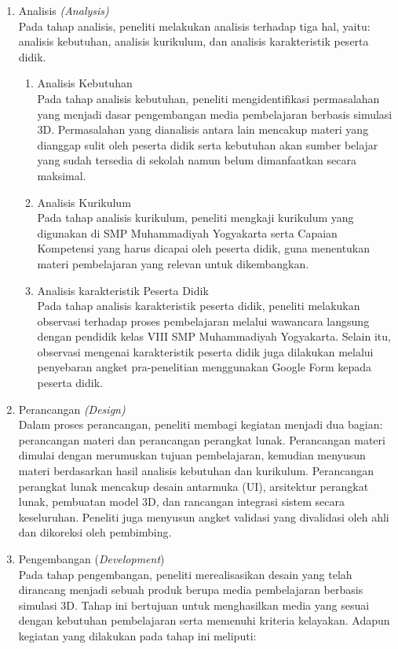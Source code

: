 \begin{enumerate}
    \item Analisis \textit{(Analysis)}\\
    \hspace*{1cm}Pada tahap analisis, peneliti melakukan analisis terhadap tiga hal, yaitu: analisis kebutuhan, analisis kurikulum, dan analisis karakteristik peserta didik.
    \begin{enumerate}
        \item Analisis Kebutuhan\\
        \hspace*{1cm}Pada tahap analisis kebutuhan, peneliti mengidentifikasi permasalahan yang menjadi dasar pengembangan media pembelajaran berbasis simulasi 3D. Permasalahan yang dianalisis antara lain mencakup materi yang dianggap sulit oleh peserta didik serta kebutuhan akan sumber belajar yang sudah tersedia di sekolah namun belum dimanfaatkan secara maksimal.
        \item Analisis Kurikulum\\
        \hspace*{1cm}Pada tahap analisis kurikulum, peneliti mengkaji kurikulum yang digunakan di SMP Muhammadiyah Yogyakarta serta Capaian Kompetensi yang harus dicapai oleh peserta didik, guna menentukan materi pembelajaran yang relevan untuk dikembangkan.
        \item Analisis karakteristik Peserta Didik\\
        \hspace*{1cm}Pada tahap analisis karakteristik peserta didik, peneliti melakukan observasi terhadap proses pembelajaran melalui wawancara langsung dengan pendidik kelas VIII SMP Muhammadiyah Yogyakarta. Selain itu, observasi mengenai karakteristik peserta didik juga dilakukan melalui penyebaran angket pra-penelitian menggunakan Google Form kepada peserta didik.
    \end{enumerate}
    \item Perancangan \textit{(Design)}\\
    \hspace*{1cm}Dalam proses perancangan, peneliti membagi kegiatan menjadi dua bagian: perancangan materi dan perancangan perangkat lunak. Perancangan materi dimulai dengan merumuskan tujuan pembelajaran, kemudian menyusun materi berdasarkan hasil analisis kebutuhan dan kurikulum. Perancangan perangkat lunak mencakup desain antarmuka (UI), arsitektur perangkat lunak, pembuatan model 3D, dan rancangan integrasi sistem secara keseluruhan. Peneliti juga menyusun angket validasi yang divalidasi oleh ahli dan dikoreksi oleh pembimbing.
    \newpage
    \item Pengembangan (\textit{Development})\\
\hspace*{1cm}Pada tahap pengembangan, peneliti merealisasikan desain yang telah dirancang menjadi sebuah produk berupa media pembelajaran berbasis simulasi 3D. Tahap ini bertujuan untuk menghasilkan media yang sesuai dengan kebutuhan pembelajaran serta memenuhi kriteria kelayakan. Adapun kegiatan yang dilakukan pada tahap ini meliputi:


\end{enumerate}

